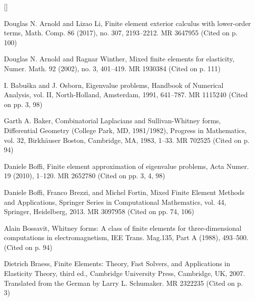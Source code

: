 \begin{list}{[]}{\setlength{\leftmargin}{2.7em}\setlength{\labelwidth}{2.2em}}
\item\label{bib:source-14}Douglas N. Arnold and Lizao Li, Finite element exterior calculus with lower-order terms, Math. Comp. 86 (2017), no. 307, 2193–2212. MR 3647955 (Cited on p. 100)

\item\label{bib:source-15}Douglas N. Arnold and Ragnar Winther, Mixed finite elements for elasticity, Numer. Math. 92 (2002), no. 3, 401–419. MR 1930384 (Cited on p. 111)

\item\label{bib:source-16}I. Babuška and J. Osborn, Eigenvalue problems, Handbook of Numerical Analysis, vol. II, North-Holland, Amsterdam, 1991, 641–787. MR 1115240 (Cited on pp. 3, 98)

\item\label{bib:source-17}Garth A. Baker, Combinatorial Laplacians and Sullivan-Whitney forms, Differential Geometry (College Park, MD, 1981/1982), Progress in Mathematics, vol. 32, Birkhäuser Boston, Cambridge, MA, 1983, 1–33. MR 702525 (Cited on p. 94)

\item\label{bib:source-18}Daniele Boffi, Finite element approximation of eigenvalue problems, Acta Numer. 19 (2010), 1–120. MR 2652780 (Cited on pp. 3, 4, 98)

\item\label{bib:source-19}Daniele Boffi, Franco Brezzi, and Michel Fortin, Mixed Finite Element Methods and Applications, Springer Series in Computational Mathematics, vol. 44, Springer, Heidelberg, 2013. MR 3097958 (Cited on pp. 74, 106)

\item\label{bib:source-20}Alain Bossavit, Whitney forms: A class of finite elements for three-dimensional computations in electromagnetism, IEE Trans. Mag.135, Part A (1988), 493–500. (Cited on p. 94)

\item\label{bib:source-21}Dietrich Braess, Finite Elements: Theory, Fast Solvers, and Applications in Elasticity Theory, third ed., Cambridge University Press, Cambridge, UK, 2007. Translated from the German by Larry L. Schumaker. MR 2322235 (Cited on p. 3)


\end{list}
